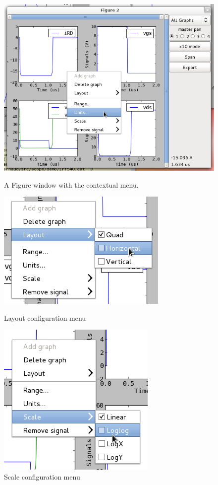 \documentclass[a4paper,11pt]{report}
\begin{document}
\begin{figure}[htbp]
  \centering
  \includegraphics[scale=.5]{../png/ioscopy-figure}
  \caption{A Figure window with the contextual menu.}
  \label{fig:fig}

  \begin{minipage}{0.45\linewidth}
    \includegraphics[scale=.5]{../png/ioscopy-layout.png}
    \caption{Layout configuration menu}
    \label{fig:layout}
  \end{minipage}
  \begin{minipage}{0.45\linewidth}
    \includegraphics[scale=.5]{../png/ioscopy-scale.png}
    \caption{Scale configuration menu}
    \label{fig:scale}
  \end{minipage}


\end{figure}
\end{document}
